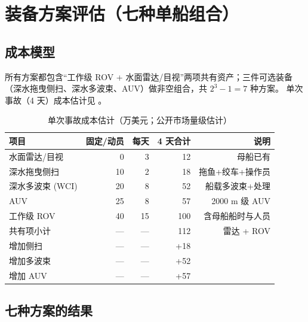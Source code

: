 \section{装备方案评估（七种单船组合）}

\subsection{成本模型}

所有方案都包含“工作级 ROV + 水面雷达/目视”两项共有资产；三件可选装备
（深水拖曳侧扫、深水多波束、AUV）做非空组合，共 $2^3-1=7$ 种方案。
单次事故（4 天）成本估计见 。

\begin{table}[H]
\centering\small
\caption{单次事故成本估计（万美元；公开市场量级估计）}
\label{tab:cost}
\begin{tabular}{@{}lrrrr@{}}
\toprule
项目 & 固定/动员 & 每天 & 4 天合计 & 说明\\
\midrule
水面雷达/目视 & 0 & 3 & 12 & 母船已有\\
深水拖曳侧扫 & 10 & 2 & 18 & 拖鱼+绞车+操作员\\
深水多波束 (WCI) & 20 & 8 & 52 & 船载多波束+处理\\
AUV & 25 & 8 & 57 & 2000 m 级 AUV\\
工作级 ROV & 40 & 15 & 100 & 含母船船时与人员\\
\midrule
共有项小计 & — & — & 112 & 雷达 + ROV\\
增加侧扫 & — & — & +18 & \\
增加多波束 & — & — & +52 & \\
增加 AUV & — & — & +57 & \\
\bottomrule
\end{tabular}
\end{table}

\subsection{七种方案的结果}


